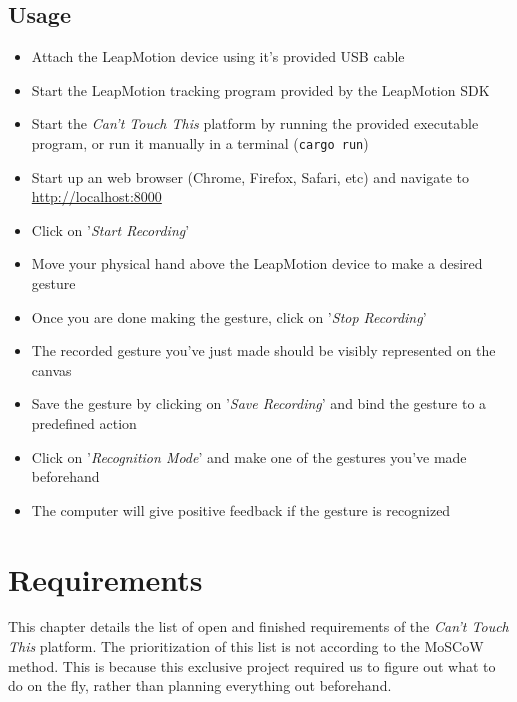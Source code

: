 \documentclass[a4paper]{article}
\providecommand{\tightlist}{%
\setlength{\itemsep}{0pt}\setlength{\parskip}{0pt}}
\begin{document}
  \subsection{Usage}
  \begin{itemize}
    \tightlist
    \item Attach the LeapMotion device using it's provided USB cable
    \item Start the LeapMotion tracking program provided by the LeapMotion SDK
    \item Start the \textit{Can't Touch This} platform by running the provided
      executable program, or run it manually in a terminal (\verb_cargo run_)
    \item Start up an web browser (Chrome, Firefox, Safari, etc) and navigate to
      \\ \url{http://localhost:8000}
    \item Click on '\textit{Start Recording}'
    \item Move your physical hand above the LeapMotion device to make a desired
      gesture
    \item Once you are done making the gesture, click on
      '\textit{Stop Recording}'
    \item The recorded gesture you've just made should be visibly represented on
      the canvas
    \item Save the gesture by clicking on '\textit{Save Recording}' and bind the
      gesture to a predefined action
    \item Click on '\textit{Recognition Mode}' and make one of the gestures
      you've made beforehand
    \item The computer will give positive feedback if the gesture is recognized
  \end{itemize}
  \clearpage

  \section{Requirements}
  This chapter details the list of open and finished requirements of the
  \textit{Can't Touch This} platform. The prioritization of this list is not
  according to the MoSCoW method. This is because this exclusive project
  required us to figure out what to do on the fly, rather than planning
  everything out beforehand.
\end{document}
